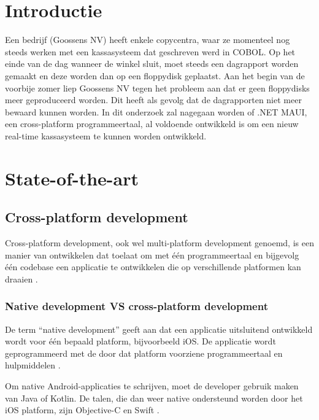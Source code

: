 
\section{Introductie}%
\label{sec:introductie}

Een bedrijf (Goossens NV) heeft enkele copycentra, waar ze momenteel nog steeds werken met een kassasysteem dat geschreven werd in COBOL. Op het einde van de dag wanneer de winkel sluit, moet steeds een dagrapport worden gemaakt en deze worden dan op een floppydisk geplaatst. Aan het begin van de voorbije zomer liep Goossens NV tegen het probleem aan dat er geen floppydisks meer geproduceerd worden. Dit heeft als gevolg dat de dagrapporten niet meer bewaard kunnen worden. In dit onderzoek zal nagegaan worden of .NET MAUI, een cross-platform programmeertaal, al voldoende ontwikkeld is om een nieuw real-time kassasysteem te kunnen worden ontwikkeld.


\section{State-of-the-art}%
\label{sec:state-of-the-art}

\subsection{Cross-platform development}
Cross-platform development, ook wel multi-platform development genoemd, is een manier van ontwikkelen dat toelaat om met één programmeertaal en bijgevolg één codebase een applicatie te ontwikkelen die op verschillende platformen kan draaien \autocite{KotlinFoundation2022}. 

\subsubsection{Native development VS cross-platform development}
De term “native development” geeft aan dat een applicatie uitsluitend ontwikkeld wordt voor één bepaald platform, bijvoorbeeld iOS. De applicatie wordt geprogrammeerd met de door dat platform voorziene programmeertaal en hulpmiddelen \autocite{Marchuk}.

Om native Android-applicaties te schrijven, moet de developer gebruik maken van Java of Kotlin. De talen, die dan weer native ondersteund worden door het iOS platform, zijn Objective-C en Swift \autocite{Schmitt2022}.

